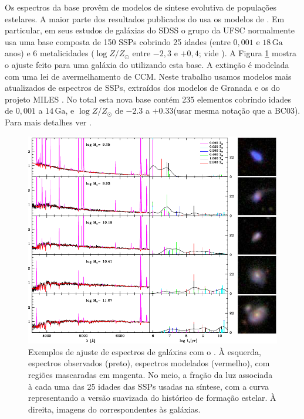 Os espectros da base provêm de modelos de síntese evolutiva de populações
estelares. A maior parte dos resultados publicados do \starlight usa os modelos
de \citet[BC03]{Bruzual2003}. Em particular, em seus estudos de galáxias do SDSS
o grupo da UFSC normalmente usa uma base composta de 150 SSPs cobrindo 25 idades
(entre $0,001$ e $18\,\mathrm{Ga}$ anos) e 6 metalicidades ($\log Z/Z_\odot$
entre $-2,3$ e $+0,4$; vide \citet{Mateus2006}). A Figura
\ref{fig:StarlightSpectrumSample} mostra o ajuste feito para uma galáxia do
\SDSS utilizando esta base. A extinção é modelada com uma lei de avermelhamento
de CCM. Neste trabalho usamos modelos mais atualizados de espectros de SSPs,
extraídos dos modelos de Granada \citep[para idades até
$63\,\mathrm{Ma}$]{GonzalezDelgado2005} e os do projeto MILES
\citep{Vazdekis2010}. No total esta nova base contém 235 elementos cobrindo
idades de  $0,001$ a $14\,\mathrm{Ga}$, e $\log Z/Z_\odot$ de $-2.3$ a
$+0.33$\fixme(usar mesma notação que a BC03).
Para mais detalhes ver \citet{GonzalezDelgado2014b, GonzalezDelgado2014a}.

\begin{figure}
	\includegraphics[width=1.0\textwidth]{figuras/starlight-fit}
	\caption[Exemplos de ajuste de espectro com o \starlight.]
	{Exemplos de ajuste de espectros de galáxias com o \starlight
	\citep{Asari2007}. À esquerda, espectros observados (preto), espectros
	modelados (vermelho), com regiões mascaradas em magenta. No meio, a fração da
	luz associada à cada uma das 25 idades das SSPs usadas na síntese, com a curva
	representando a versão suavizada do histórico de formação estelar. À direita,
	imagens do \SDSS correspondentes às galáxias.}
	\label{fig:StarlightSpectrumSample}
\end{figure}

